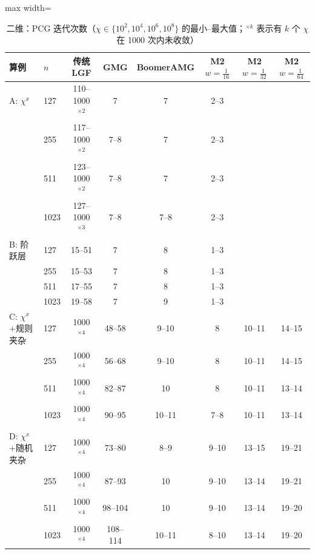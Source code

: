 \begin{table}[H]\centering\small
\caption{二维：PCG 迭代次数（$\chi\in\{10^2,10^4,10^6,10^8\}$ 的最小--最大值；$^{\times k}$ 表示有 $k$ 个 $\chi$ 在 1000 次内未收敛）}\label{tab:its2d}
\begin{adjustbox}{max width=\textwidth}
\begin{tabular}{llcccccc}
\toprule
算例 & $n$ & 传统 LGF & GMG & BoomerAMG & M2 $w{=}\frac1{16}$ & M2 $w{=}\frac1{32}$ & M2 $w{=}\frac1{64}$ \\
\midrule
A: $\chi^x$ & 127 & 110--1000$^{\times2}$ & 7 & 7 & 2--3 &  &  \\
 & 255 & 117--1000$^{\times2}$ & 7--8 & 7 & 2--3 &  &  \\
 & 511 & 123--1000$^{\times2}$ & 7--8 & 7 & 2--3 &  &  \\
 & 1023 & 127--1000$^{\times3}$ & 7--8 & 7--8 & 2--3 &  &  \\
\midrule
B: 阶跃层 & 127 & 15--51 & 7 & 8 & 1--3 &  &  \\
 & 255 & 15--53 & 7 & 8 & 1--3 &  &  \\
 & 511 & 17--55 & 7 & 8 & 1--3 &  &  \\
 & 1023 & 19--58 & 7 & 9 & 1--3 &  &  \\
\midrule
C: $\chi^x$+规则夹杂 & 127 & 1000$^{\times4}$ & 48--58 & 9--10 & 8 & 10--11 & 14--15 \\
 & 255 & 1000$^{\times4}$ & 56--68 & 9--10 & 8 & 10--11 & 14--15 \\
 & 511 & 1000$^{\times4}$ & 82--87 & 10 & 8 & 10--11 & 13--14 \\
 & 1023 & 1000$^{\times4}$ & 90--95 & 10--11 & 7--8 & 10--11 & 13--14 \\
\midrule
D: $\chi^x$+随机夹杂 & 127 & 1000$^{\times4}$ & 73--80 & 8--9 & 9--10 & 13--15 & 19--21 \\
 & 255 & 1000$^{\times4}$ & 87--93 & 10 & 9--10 & 13--14 & 19--21 \\
 & 511 & 1000$^{\times4}$ & 98--104 & 10 & 9--10 & 13--14 & 19--20 \\
 & 1023 & 1000$^{\times4}$ & 108--114 & 10--11 & 8--10 & 13--14 & 19--20 \\
\bottomrule
\end{tabular}
\end{adjustbox}
\end{table}

